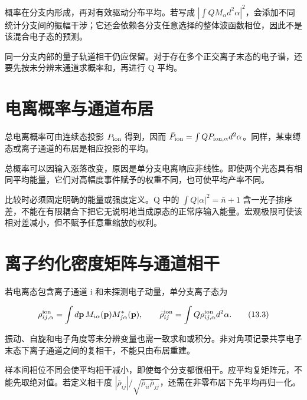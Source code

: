 \documentclass[UTF8,a4paper,zihao=-4,openany,fontset=fandol]{ctexbook}
\begin{document}
概率在分支内形成，再对有效驱动分布平均。若写成 $|\int QM_\alpha d^2\alpha|^2$，会添加不同统计分支间的振幅干涉；它还会依赖各分支任意选择的整体波函数相位，因此不是该混合电子态的预测。



同一分支内部的量子轨道相干仍应保留。对于存在多个正交离子末态的电子谱，还要先按未分辨末通道求概率和，再进行 Q 平均。



\section{电离概率与通道布居}\label{sec:13:3}


总电离概率可由连续态投影 $P_{\rm ion}$ 得到，因而 $\bar P_{\rm ion}=\int QP_{{\rm ion},\alpha}d^2\alpha$。同样，某束缚态或离子通道的布居是相应投影的平均。



总概率可以因输入涨落改变，原因是单分支电离响应非线性。即使两个光态具有相同平均能量，它们对高幅度事件赋予的权重不同，也可使平均产率不同。



比较时必须固定明确的能量或强度定义。Q 中的 $\int Q|\alpha|^2=\bar n+1$ 含一光子排序差，不能在有限耦合下把它无说明地当成原态的正常序输入能量。宏观极限可使该相对差减小，但不赋予任意重缩放的权利。



\section{离子约化密度矩阵与通道相干}\label{sec:13:4}


若电离态包含离子通道 i 和未探测电子动量，单分支离子态为



\begin{equation*}
\rho^{\rm ion}_{ij,\alpha}
=\int d\mathbf p\,M_{i\alpha}(\mathbf p)M_{j\alpha}^*(\mathbf p),
\qquad\bar\rho^{\rm ion}_{ij}=\int Q\rho^{\rm ion}_{ij,\alpha}d^2\alpha.
\tag{13.3}\label{eq:13.3}
\end{equation*}


振动、自旋和电子角度等未分辨变量也需一致求和或积分。非对角项记录共享电子末态下离子通道之间的复相干，不能只由布居重建。



样本间相位不同会使平均相干减小，即使每个分支都很相干。应平均复矩阵元，不能先取绝对值。若定义相干度 $|\bar\rho_{ij}|/\sqrt{\bar\rho_{ii}\bar\rho_{jj}}$，还需在非零布居下先平均再归一化。
\end{document}
